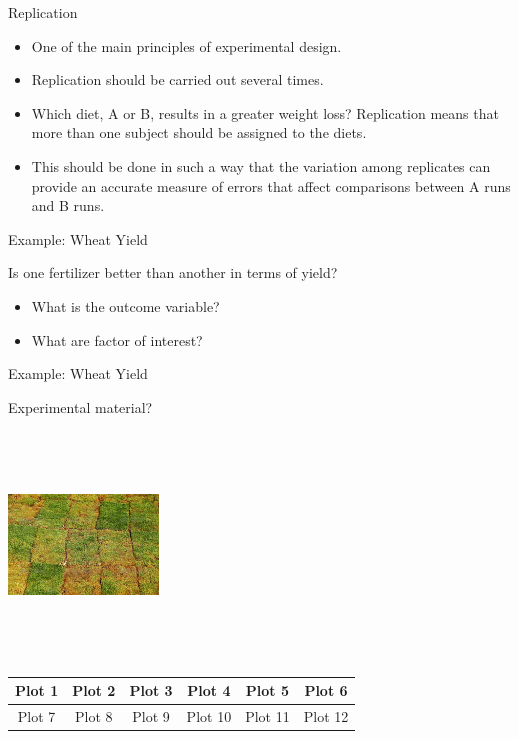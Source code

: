 \documentclass[10pt,ignorenonframetext,]{beamer}
\begin{document}
\begin{frame}{Replication}

\begin{itemize}
\item
  One of the main principles of experimental design.
\item
  Replication should be carried out several times.
\item
  Which diet, A or B, results in a greater weight loss? Replication
  means that more than one subject should be assigned to the diets.
\item
  This should be done in such a way that the variation among replicates
  can provide an accurate measure of errors that affect comparisons
  between A runs and B runs.
\end{itemize}

\end{frame}

\begin{frame}{Example: Wheat Yield}

Is one fertilizer better than another in terms of yield?

\begin{itemize}
\item
  What is the outcome variable?
\item
  What are factor of interest?
\end{itemize}

\end{frame}

\begin{frame}{Example: Wheat Yield}

Experimental material?

\includegraphics[width=4cm,height=6cm]{img_6433.jpg}

\begin{table}[]
\centering
\label{my-label}
\begin{tabular}{|c|c|c|c|c|c|}
\hline
Plot 1 & Plot 2     & Plot 3     & Plot 4     & Plot 5    & Plot 6 \\ \hline
Plot 7 & Plot 8     & Plot 9     & Plot 10     &Plot 11    &Plot 12  \\ \hline
\end{tabular}
\end{table}

\end{frame}
\end{document}
